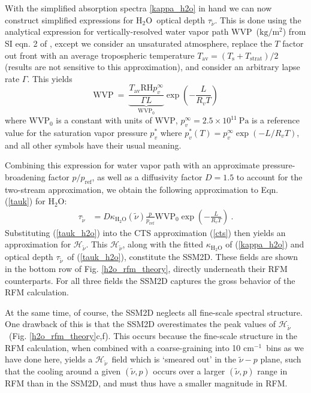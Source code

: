 \documentclass{ametsoc}
\newcommand{\beqn}{\begin{equation}}
\newcommand{\eeqn}{\end{equation}}
\newcommand{\eqnref}[1]{(\ref{#1})}
\newcommand{\comment}[1]{\textcolor{blue}{[{#1}]}}
\newcommand{\kg}{\ensuremath{\mathrm{kg}}}
\newcommand{\meter}{\ensuremath{\mathrm{m}}}
\newcommand{\cminverse}{\ensuremath{\mathrm{cm^{-1}}}}
\newcommand{\Pa}{\ensuremath{\mathrm{Pa}}}
\newcommand{\Rv}{\ensuremath{R_v}}
\newcommand{\Ts}{\ensuremath{T_\mathrm{s}}}
\newcommand{\htwo}{\ensuremath{\mathrm{H_2O}}}
\newcommand{\RH}{\ensuremath{\mathrm{RH}}}
\newcommand{\wv}{\ensuremath{\widetilde{\nu}}}
\newcommand{\ch}{\ensuremath{\mathcal{H}}}
\newcommand{\chk}{\ensuremath{\ch_{\wv}}}
\newcommand{\tauk}{\ensuremath{\tau_{\wv}}}
\newcommand{\pref}{\ensuremath{p_{\mathrm{ref}}}}
\newcommand{\WVP}{\ensuremath{\mathrm{WVP}}}
\newcommand{\Tav}{\ensuremath{T_{\mathrm{av}}}}
\newcommand{\Tstrat}{\ensuremath{T_{\mathrm{strat}}}}
\begin{document}
With the simplified absorption spectra \eqref{kappa_h2o} in hand we can now construct simplified expressions for \htwo\  optical depth \tauk. This is done using the analytical expression for vertically-resolved water vapor path \WVP\ ($\kg/\meter^2$) from SI eqn. 2 of  \cite{koll2018}, except we consider an unsaturated atmosphere, replace the $T$ factor out front with an average tropospheric temperature $\Tav = (\Ts+\Tstrat)/2$ (results are not sensitive to this approximation), and consider an arbitrary lapse rate $\Gamma$. This yields
\beqn
	\WVP  \ = \   \underbrace{\frac{\Tav \RH p_v^\infty}{\Gamma L}}_{\WVP_0}\exp\left(-\frac{L}{\Rv T}\right)
\eeqn
where $\WVP_0$ is a constant with units of \WVP,   $p_v^\infty=2.5\times 10^{11}\ \Pa$ is a reference value for the saturation vapor pressure $p^*_v$ where  $p^*_v(T) = p^\infty_v \exp(-L/\Rv T)$, and all other symbols have their usual meaning.


 Combining this expression for water vapor path with an approximate pressure-broadening factor $p/\pref$, as well as a diffusivity factor $D=1.5$ to account for the two-stream approximation, we obtain the following approximation to Eqn. \eqnref{tauk} for \htwo:
\begin{align}
	 \tauk & = D\kappa_{\htwo}(\wv)\frac{p}{\pref}\WVP_0 \exp\left(-\frac{L}{\Rv T}\right) \ .
	\label{tauk_h2o} 
\end{align}
  Substituting \eqnref{tauk_h2o} into the CTS approximation \eqnref{cts} then yields an approximation for  \chk. This \chk, along with the fitted $\kappa_{\htwo}$ of \eqnref{kappa_h2o} and optical depth  \tauk\ of \eqnref{tauk_h2o}, constitute the SSM2D. These fields are shown in the bottom row of Fig. \ref{h2o_rfm_theory}, directly underneath their RFM counterparts. For all three fields the SSM2D captures the gross behavior of the RFM calculation.
  
 At the same time, of course, the SSM2D neglects all  fine-scale spectral structure. One drawback of this is that the SSM2D  overestimates the peak values of \chk\  (Fig. \ref{h2o_rfm_theory}c,f). This  occurs because the fine-scale structure in the RFM calculation, when combined with a coarse-graining into 10 \cminverse\ bins as we have done here, yields a \chk\ field which is `smeared out' in  the $\wv-p$ plane, such that the cooling around a given $(\wv,p)$ occurs over a larger $(\wv,p)$ range in RFM than in the SSM2D, and must thus have a smaller magnitude in RFM. 
 
\end{document}
